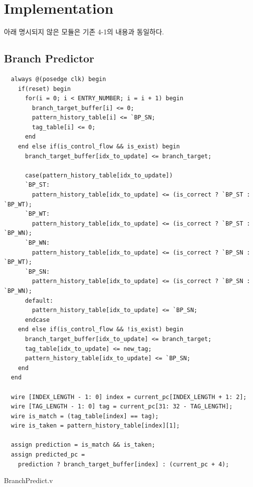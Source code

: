 \documentclass[openright, a4paper]{article}
\newenvironment{longlisting}{\captionsetup{type=listing}}{}
\begin{document}

\section{Implementation}

아래 명시되지 않은 모듈은 기존 4-1의 내용과 동일하다. \\

\subsection{Branch Predictor}

\begin{longlisting}
    \begin{verbatim}
  always @(posedge clk) begin
    if(reset) begin
      for(i = 0; i < ENTRY_NUMBER; i = i + 1) begin
        branch_target_buffer[i] <= 0;
        pattern_history_table[i] <= `BP_SN;
        tag_table[i] <= 0;
      end
    end else if(is_control_flow && is_exist) begin
      branch_target_buffer[idx_to_update] <= branch_target;
      
      case(pattern_history_table[idx_to_update])
      `BP_ST:
        pattern_history_table[idx_to_update] <= (is_correct ? `BP_ST : `BP_WT);
      `BP_WT: 
        pattern_history_table[idx_to_update] <= (is_correct ? `BP_ST : `BP_WN);
      `BP_WN: 
        pattern_history_table[idx_to_update] <= (is_correct ? `BP_SN : `BP_WT);
      `BP_SN: 
        pattern_history_table[idx_to_update] <= (is_correct ? `BP_SN : `BP_WN);
      default:
        pattern_history_table[idx_to_update] <= `BP_SN;
      endcase
    end else if(is_control_flow && !is_exist) begin
      branch_target_buffer[idx_to_update] <= branch_target;
      tag_table[idx_to_update] <= new_tag;
      pattern_history_table[idx_to_update] <= `BP_SN;
    end
  end

  wire [INDEX_LENGTH - 1: 0] index = current_pc[INDEX_LENGTH + 1: 2];
  wire [TAG_LENGTH - 1: 0] tag = current_pc[31: 32 - TAG_LENGTH];
  wire is_match = (tag_table[index] == tag);
  wire is_taken = pattern_history_table[index][1];

  assign prediction = is_match && is_taken;
  assign predicted_pc = 
    prediction ? branch_target_buffer[index] : (current_pc + 4);
    \end{verbatim}
    \caption{BranchPredict.v}
\end{longlisting}
\end{document}

